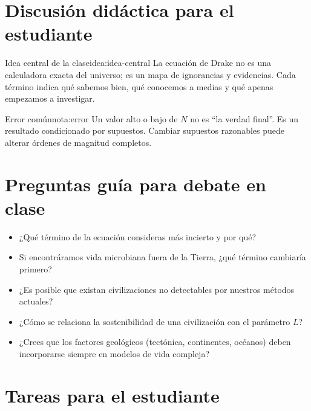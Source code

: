 \documentclass[12pt,oneside]{book}
\begin{document}
\section{Discusión didáctica para el estudiante}

\begin{idea}{Idea central de la clase}{idea:idea-central}
La ecuación de Drake no es una calculadora exacta del universo; es un mapa de ignorancias y evidencias. Cada término indica qué sabemos bien, qué conocemos a medias y qué apenas empezamos a investigar.
\end{idea}

\begin{nota}{Error común}{nota:error}
Un valor alto o bajo de $N$ no es ``la verdad final''. Es un resultado condicionado por supuestos. Cambiar supuestos razonables puede alterar órdenes de magnitud completos.
\end{nota}

\section{Preguntas guía para debate en clase}

\begin{itemize}[leftmargin=1.5em]
    \item ¿Qué término de la ecuación consideras más incierto y por qué?
    \item Si encontráramos vida microbiana fuera de la Tierra, ¿qué término cambiaría primero?
    \item ¿Es posible que existan civilizaciones no detectables por nuestros métodos actuales?
    \item ¿Cómo se relaciona la sostenibilidad de una civilización con el parámetro $L$?
    \item ¿Crees que los factores geológicos (tectónica, continentes, océanos) deben incorporarse siempre en modelos de vida compleja?
\end{itemize}

\section{Tareas para el estudiante}
\end{document}
